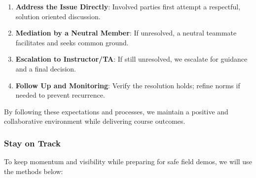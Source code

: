 \documentclass{article}
\begin{document}
\begin{enumerate}
  \item \textbf{Address the Issue Directly}: Involved parties first attempt a
    respectful, solution oriented discussion.
  \item \textbf{Mediation by a Neutral Member}: If unresolved, a neutral
    teammate facilitates and seeks common ground.
  \item \textbf{Escalation to Instructor/TA}: If still unresolved, we escalate
    for guidance and a final decision.
  \item \textbf{Follow Up and Monitoring}: Verify the resolution holds; refine
    norms if needed to prevent recurrence.
\end{enumerate}

By following these expectations and processes, we maintain a positive and
collaborative environment while delivering course outcomes.

\subsubsection*{\color{blue}Stay on Track}

To keep momentum and visibility while preparing for safe field demos, we will
use the methods below:
\end{document}
